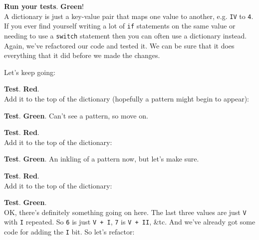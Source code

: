 \textbf{Run your tests}. \textbf{Green}!
\\

A dictionary is just a key-value pair that maps one value to another, e.g. \texttt{IV} to \texttt{4}. If you ever find yourself writing a lot of \texttt{if} statements on the same value or needing to use a \texttt{switch} statement then you can often use a dictionary instead.
\\

Again, we've refactored our code and tested it. We can be sure that it does everything that it did before we made the changes.

\pagebreak

Let's keep going:



\textbf{Test}. \textbf{Red}.
\\

Add it to the top of the dictionary (hopefully a pattern might begin to appear):



\textbf{Test}. \textbf{Green}. Can't see a pattern, so move on.



\textbf{Test}. \textbf{Red}.
\\

Add it to the top of the dictionary:


\pagebreak

\textbf{Test}. \textbf{Green}. An inkling of a pattern now, but let's make sure.



\textbf{Test}. \textbf{Red}.
\\

Add it to the top of the dictionary:



\textbf{Test}. \textbf{Green}.
\\

OK, there's definitely something going on here. The last three values are just \texttt{V} with \texttt{I} repeated. So \texttt{6} is just \texttt{V + I}, \texttt{7} is \texttt{V + II}, \&tc. And we've already got some code for adding the \texttt{I} bit. So let's refactor:

